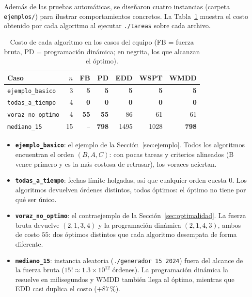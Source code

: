 \documentclass[10pt,twocolumn,letterpaper]{article}
\begin{document}
Además de las pruebas automáticas, se diseñaron cuatro instancias
(carpeta \texttt{ejemplos/}) para ilustrar comportamientos concretos. La
Tabla~\ref{tab:casos} muestra el costo obtenido por cada algoritmo al ejecutar
\texttt{./tareas} sobre cada archivo.

\begin{table}[h]
\centering
\caption{Costo de cada algoritmo en los casos del equipo (FB = fuerza bruta,
PD = programación dinámica; en negrita, los que alcanzan el óptimo).}\label{tab:casos}
\small\setlength{\tabcolsep}{3pt}
\begin{tabular}{lrrrrrr}
\toprule
Caso & $n$ & FB & PD & EDD & WSPT & WMDD\\
\midrule
\texttt{ejemplo\_basico}   & 3  & \textbf{5}  & \textbf{5}  & \textbf{5}  & \textbf{5}  & \textbf{5}\\
\texttt{todas\_a\_tiempo}  & 4  & \textbf{0}  & \textbf{0}  & \textbf{0}  & \textbf{0}  & \textbf{0}\\
\texttt{voraz\_no\_optimo} & 4  & \textbf{55} & \textbf{55} & 86 & 61 & 61\\
\texttt{mediano\_15}       & 15 & --          & \textbf{798} & 1495 & 1028 & \textbf{798}\\
\bottomrule
\end{tabular}
\end{table}

\begin{itemize}
  \item \textbf{\texttt{ejemplo\_basico}}: el ejemplo de la
        Sección~\ref{sec:ejemplo}. Todos los algoritmos encuentran el orden
        $(B,A,C)$: con pocas tareas y criterios alineados (B vence primero y
        es la más costosa de retrasar), los voraces aciertan.
  \item \textbf{\texttt{todas\_a\_tiempo}}: fechas límite holgadas, así que
        cualquier orden cuesta $0$. Los algoritmos devuelven órdenes distintos,
        todos óptimos: el óptimo no tiene por qué ser único.
  \item \textbf{\texttt{voraz\_no\_optimo}}: el contraejemplo de la
        Sección~\ref{sec:optimalidad}. La fuerza bruta devuelve $(2,1,3,4)$ y
        la programación dinámica $(2,1,4,3)$, ambos de costo $55$: dos óptimos
        distintos que cada algoritmo desempata de forma diferente.
  \item \textbf{\texttt{mediano\_15}}: instancia aleatoria
        (\texttt{./generador 15 2024}) fuera del alcance de la fuerza bruta
        ($15!\approx1.3\times10^{12}$ órdenes). La programación dinámica la
        resuelve en milisegundos y WMDD también llega al óptimo, mientras que
        EDD casi duplica el costo ($+87$\,\%).
\end{itemize}
\end{document}
